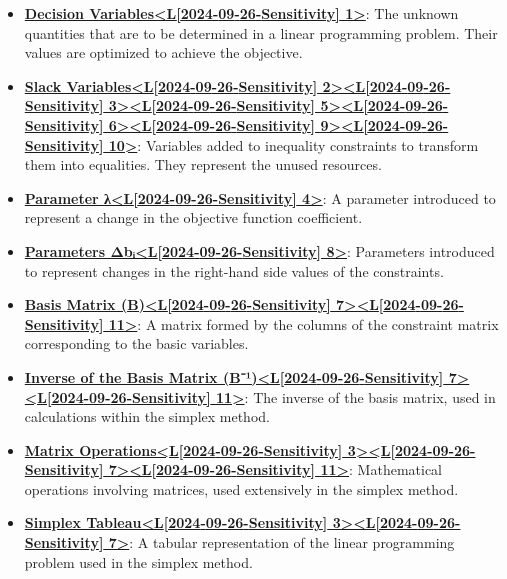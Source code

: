 \documentclass{article}%
\begin{document}
\begin{itemize}[leftmargin=*]
\item \href{https://www.math.purdue.edu/~yipn/421/2024-09-26-Sensitivity.pdf#page=1}{\textbf{Decision Variables<L{[}2024{-}09{-}26{-}Sensitivity{]} 1>}}: The unknown quantities that are to be determined in a linear programming problem. Their values are optimized to achieve the objective. %
\item \href{https://www.math.purdue.edu/~yipn/421/2024-09-26-Sensitivity.pdf#page=2}{\textbf{Slack Variables<L{[}2024{-}09{-}26{-}Sensitivity{]} 2><L{[}2024{-}09{-}26{-}Sensitivity{]} 3><L{[}2024{-}09{-}26{-}Sensitivity{]} 5><L{[}2024{-}09{-}26{-}Sensitivity{]} 6><L{[}2024{-}09{-}26{-}Sensitivity{]} 9><L{[}2024{-}09{-}26{-}Sensitivity{]} 10>}}: Variables added to inequality constraints to transform them into equalities. They represent the unused resources. %
\item \href{https://www.math.purdue.edu/~yipn/421/2024-09-26-Sensitivity.pdf#page=4}{\textbf{Parameter λ<L{[}2024{-}09{-}26{-}Sensitivity{]} 4>}}: A parameter introduced to represent a change in the objective function coefficient.%
\item \href{https://www.math.purdue.edu/~yipn/421/2024-09-26-Sensitivity.pdf#page=8}{\textbf{Parameters Δbᵢ<L{[}2024{-}09{-}26{-}Sensitivity{]} 8>}}: Parameters introduced to represent changes in the right-hand side values of the constraints.%
\item \href{https://www.math.purdue.edu/~yipn/421/2024-09-26-Sensitivity.pdf#page=7}{\textbf{Basis Matrix (B)<L{[}2024{-}09{-}26{-}Sensitivity{]} 7><L{[}2024{-}09{-}26{-}Sensitivity{]} 11>}}: A matrix formed by the columns of the constraint matrix corresponding to the basic variables.%
\item \href{https://www.math.purdue.edu/~yipn/421/2024-09-26-Sensitivity.pdf#page=7}{\textbf{Inverse of the Basis Matrix (B⁻¹)<L{[}2024{-}09{-}26{-}Sensitivity{]} 7><L{[}2024{-}09{-}26{-}Sensitivity{]} 11>}}: The inverse of the basis matrix, used in calculations within the simplex method.%
\item \href{https://www.math.purdue.edu/~yipn/421/2024-09-26-Sensitivity.pdf#page=3}{\textbf{Matrix Operations<L{[}2024{-}09{-}26{-}Sensitivity{]} 3><L{[}2024{-}09{-}26{-}Sensitivity{]} 7><L{[}2024{-}09{-}26{-}Sensitivity{]} 11>}}: Mathematical operations involving matrices, used extensively in the simplex method.%
\item \href{https://www.math.purdue.edu/~yipn/421/2024-09-26-Sensitivity.pdf#page=3}{\textbf{Simplex Tableau<L{[}2024{-}09{-}26{-}Sensitivity{]} 3><L{[}2024{-}09{-}26{-}Sensitivity{]} 7>}}: A tabular representation of the linear programming problem used in the simplex method.%

\end{itemize}
\end{document}
